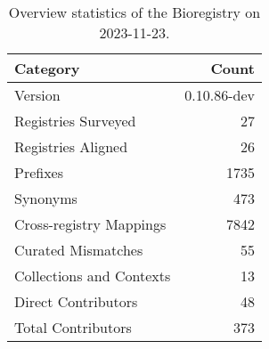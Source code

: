 \begin{table}
\caption{Overview statistics of the Bioregistry on 2023-11-23.}
\label{tab:bioregistry-summary}
\begin{tabular}{lr}
\toprule
Category & Count \\
\midrule
Version & 0.10.86-dev \\
Registries Surveyed & 27 \\
Registries Aligned & 26 \\
Prefixes & 1735 \\
Synonyms & 473 \\
Cross-registry Mappings & 7842 \\
Curated Mismatches & 55 \\
Collections and Contexts & 13 \\
Direct Contributors & 48 \\
Total Contributors & 373 \\
\bottomrule
\end{tabular}
\end{table}
